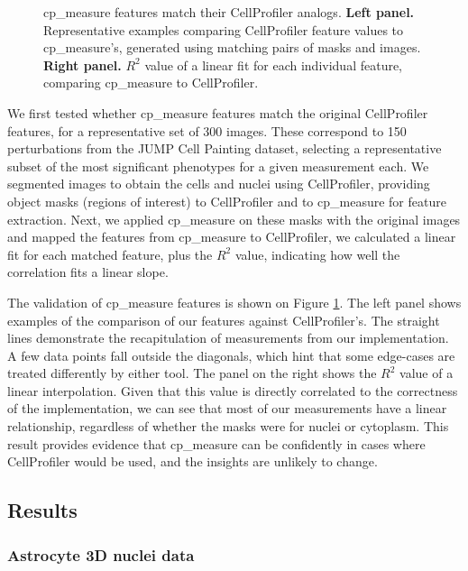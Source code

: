 \documentclass{article}
\begin{document}
\begin{figure}[htbp]
\centering

\caption{\label{fig:cp_vs_cpmeasure}cp\_measure features match their CellProfiler analogs. \textbf{Left panel.} Representative examples comparing CellProfiler feature values to cp\_measure's, generated using matching pairs of masks and images. \textbf{Right panel.} \(R^2\) value of a linear fit for each individual feature, comparing cp\_measure to CellProfiler.}
\end{figure}

We first tested whether cp\_measure features match the original CellProfiler features, for a representative set of 300 images. These correspond to 150 perturbations from the JUMP Cell Painting dataset\citep{chandrasekaranJUMPCellPainting2023}, selecting a representative subset of the most significant phenotypes for a given measurement each. We segmented images to obtain the cells and nuclei using CellProfiler, providing object masks (regions of interest) to CellProfiler and to cp\_measure for feature extraction. Next, we applied cp\_measure on these masks with the original images and mapped the features from cp\_measure to CellProfiler, we calculated a linear fit for each matched feature, plus the \(R^2\) value, indicating how well the correlation fits a linear slope.

The validation of cp\_measure features is shown on Figure \ref{fig:cp_vs_cpmeasure}. The left panel shows examples of the comparison of our features against CellProfiler's. The straight lines demonstrate the recapitulation of measurements from our implementation. A few data points fall outside the diagonals, which hint that some edge-cases are treated differently by either tool. The panel on the right shows the \(R^2\) value of a linear interpolation. Given that this value is directly correlated to the correctness of the implementation, we can see that most of our measurements have a linear relationship, regardless of whether the masks were for nuclei or cytoplasm. This result provides evidence that cp\_measure can be confidently in cases where CellProfiler would be used, and the insights are unlikely to change.
\subsection{Results}
\label{sec:orge5b5c6b}
\subsubsection{Astrocyte 3D nuclei data}
\label{sec:org447090b}
\end{document}
